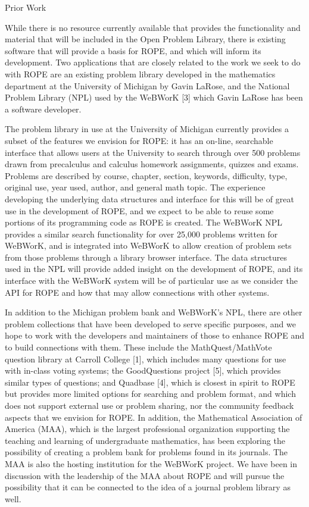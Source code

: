\documentclass[11pt]{article}
\begin{document}
\begin{section}{Prior Work}

While there is no resource currently available that provides the
functionality and material that will be included in the Open Problem
Library, there is existing software that will provide a basis for ROPE,
and which will inform its development.  Two applications that are closely
related to the work we seek to do with ROPE are an existing problem
library developed in the mathematics department at the University of
Michigan by Gavin LaRose, and the National Problem Library (NPL) used by
the WeBWorK [3] %
which Gavin LaRose has been a software developer.

The problem library in use at the University of Michigan currently
provides a subset of the features we envision for ROPE: it has an
on-line, searchable interface that allows users at the University to
search through over 500 problems drawn from precalculus and calculus
homework assignments, quizzes and exams.  Problems are described by
course, chapter, section, keywords, difficulty, type, original use, year
used, author, and general math topic.  The experience developing the
underlying data structures and interface for this will be of great use in
the development of ROPE, and we expect to be able to reuse some
portions of its programming code as ROPE is created.  The WeBWorK NPL
provides a similar search functionality for over 25,000 problems written
for WeBWorK, and is integrated into WeBWorK to allow creation of problem
sets from those problems through a library browser interface.  The data
structures used in the NPL will provide added insight on the development
of ROPE, and its interface with the WeBWorK system will be of
particular use as we consider the API for ROPE and how that may allow
connections with other systems.

In addition to the Michigan problem bank and WeBWorK's NPL, there are
other problem collections that have been developed to serve specific
purposes, and we hope to work with the developers and maintainers of those
to enhance ROPE and to build connections with them.  These include the
MathQuest/MathVote question library at Carroll College [1], %
which includes many questions for use with in-class voting systems; the
GoodQuestions project [5], %
which provides similar types of
questions; and Quadbase [4], %
which is closest in spirit to ROPE but provides more limited options for searching and problem format,
and which does not support external use or problem sharing, nor the
community feedback aspects that we envision for ROPE.  In addition, the
Mathematical Association of America (MAA), which is the largest
professional organization supporting the teaching and learning of
undergraduate mathematics, has been exploring the possibility of creating
a problem bank for problems found in its journals.  The MAA is also the
hosting institution for the WeBWorK project.  We have been in discussion
with the leadership of the MAA about ROPE and will pursue the
possibility that it can be connected to the idea of a journal problem
library as well.


\end{section}
\end{document}

